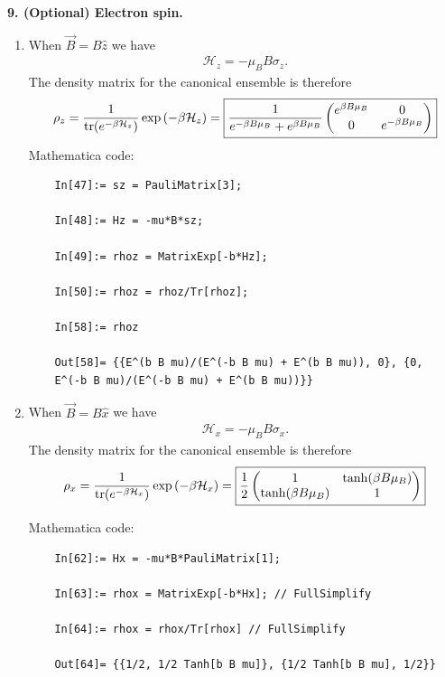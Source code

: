 \documentclass{article}
\theoremstyle{definition}
\newcommand{\ham}{\mathcal{H}}
\newcommand{\be}{\beta}
\newcommand{\f}[2]{\frac{#1}{#2}}
\newcommand{\lp}{\left(}
\newcommand{\rp}{\right)}
\begin{document}
\noindent \textbf{9. (Optional) Electron spin. }

\begin{enumerate}[label=(\alph*)]
	\item When $\vec{B} = B\hat{z}$ we have
	\begin{align*}
	\ham_z = -\mu_B B \sigma_z.
	\end{align*}
	The density matrix for the canonical ensemble is therefore
	\begin{align*}
	\rho_z = \f{1}{\tr(e^{-\be\ham_z })}\exp\lp -\be \ham_z \rp = \boxed{\f{1}{e^{-\be B \mu_B} + e^{\be B \mu_B}}\begin{pmatrix}
	e^{\be B \mu_B} & 0 \\ 0 & e^{-\be B \mu_B}
	\end{pmatrix}}
	\end{align*}
	Mathematica code:
	\begin{lstlisting}
	In[47]:= sz = PauliMatrix[3];
	
	In[48]:= Hz = -mu*B*sz;
	
	In[49]:= rhoz = MatrixExp[-b*Hz];
	
	In[50]:= rhoz = rhoz/Tr[rhoz];
	
	In[58]:= rhoz
	
	Out[58]= {{E^(b B mu)/(E^(-b B mu) + E^(b B mu)), 0}, {0, 
	E^(-b B mu)/(E^(-b B mu) + E^(b B mu))}}
	\end{lstlisting}
	
	\item When $\vec{B} = B\hat{x}$ we have
	\begin{align*}
	\ham_x = -\mu_B B \sigma_x.
	\end{align*}
	The density matrix for the canonical ensemble is therefore
	\begin{align*}
	\rho_x = \f{1}{\tr(e^{-\be\ham_x })}\exp\lp -\be \ham_x \rp = 
	\boxed{\f{1}{2}\begin{pmatrix}
		1 & \tanh(\be B \mu_B) \\ \tanh(\be B \mu_B) & 1 
		\end{pmatrix}}
	\end{align*}
	
	Mathematica code:
	\begin{lstlisting}
	In[62]:= Hx = -mu*B*PauliMatrix[1];
	
	In[63]:= rhox = MatrixExp[-b*Hx]; // FullSimplify
	
	In[64]:= rhox = rhox/Tr[rhox] // FullSimplify
	
	Out[64]= {{1/2, 1/2 Tanh[b B mu]}, {1/2 Tanh[b B mu], 1/2}}
	\end{lstlisting}
	

\end{enumerate}
\end{document}
